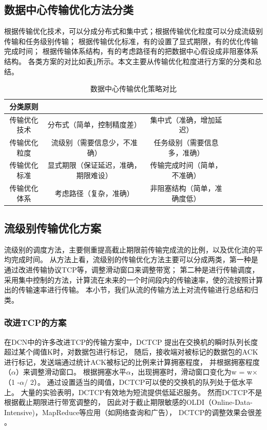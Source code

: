 \subsection{数据中心传输优化方法分类}
根据传输优化技术，可以分成分布式和集中式；根据传输优化粒度可以分成流级别传输和任务级别传输；
根据传输优化标准，有的设置了显式期限，有的优化传输完成时间；
根据传输体系结构，有的考虑路径有的把数据中心假设成非阻塞体系结构。
各类方案的对比如表\ref{methods-compare}所示。本文主要从传输优化粒度进行方案的分类和总结。
\begin{table}[h]
\centering
\caption{数据中心传输优化策略对比}\label{methods-compare}
\renewcommand{\arraystretch}{1.5}
\begin{tabular}{|c|c|c|c|c|c|c|c|} \hline
\setlength{\tabcolsep}{10pt}
分类原则& &\\ \hline
传输优化技术 &分布式（简单，控制精度差）&集中式（准确，增加延迟）\\ \hline
传输优化粒度 &流级别（需要信息少，不准确）&任务级别（需要信息多，准确）\\ \hline
传输优化标准 &显式期限（保证延迟，准确，期限难设）&传输完成时间（简单，不准确）\\ \hline
传输优化体系 &考虑路径（复杂，准确）&非阻塞结构（简单，准确度低）\\ \hline
\end{tabular}
\end{table}




\subsection{流级别传输优化方案}
流级别的调度方法，主要侧重提高截止期限前传输完成流的比例，以及优化流的平均完成时间。
从方法上看，流级别的传输优化方法主要可以分成两类，第一种是通过改进传输协议TCP等，调整滑动窗口来调整带宽；
第二种是进行传输调度，采用集中控制的方法，计算流在未来的一个时间段内的传输速率，使的流按照计算出的传输速率进行传输。
本小节，我们从流的传输方法上对流传输进行总结和归类。

\subsubsection{改进TCP的方案} 
在DCN中的许多改进TCP的传输方案中，DCTCP\cite{DCTCP}
提出在交换机的瞬时队列长度超过某个阈值K时，对数据包进行标记，
随后，接收端对被标记的数据包的ACK进行标记，发送端通过统计ACK被标记的比例来计算拥塞程度，
并根据拥塞程度（$\alpha$）来调整滑动窗口。
根据拥塞水平$\alpha$，出现拥塞时，滑动窗口变化为w = w$\times$（1 -$\alpha$/ 2）。
通过设置适当的阈值，DCTCP可以使的交换机的队列处于低水平上。
大量的实验表明，DCTCP有效地为短流提供低延迟服务。
然而DCTCP不是根据截止期限进行带宽调整的，
因此对于截止期限敏感的OLDI（Online-Data-Intensive)，MapReduce等应用（如网络查询和广告），
DCTCP的调整效果会很差 \cite{D2TCP}。

